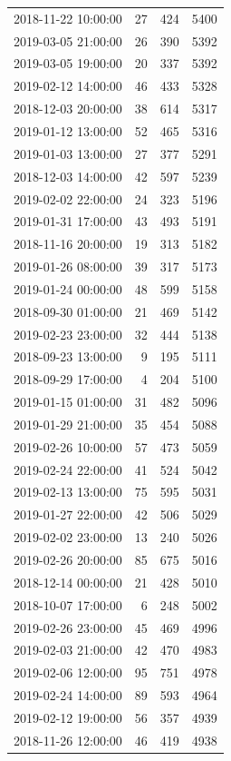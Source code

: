 \begin{tabular}{lrrr}
2018-11-22 10:00:00 & 27 & 424 & 5400 \\
2019-03-05 21:00:00 & 26 & 390 & 5392 \\
2019-03-05 19:00:00 & 20 & 337 & 5392 \\
2019-02-12 14:00:00 & 46 & 433 & 5328 \\
2018-12-03 20:00:00 & 38 & 614 & 5317 \\
2019-01-12 13:00:00 & 52 & 465 & 5316 \\
2019-01-03 13:00:00 & 27 & 377 & 5291 \\
2018-12-03 14:00:00 & 42 & 597 & 5239 \\
2019-02-02 22:00:00 & 24 & 323 & 5196 \\
2019-01-31 17:00:00 & 43 & 493 & 5191 \\
2018-11-16 20:00:00 & 19 & 313 & 5182 \\
2019-01-26 08:00:00 & 39 & 317 & 5173 \\
2019-01-24 00:00:00 & 48 & 599 & 5158 \\
2018-09-30 01:00:00 & 21 & 469 & 5142 \\
2019-02-23 23:00:00 & 32 & 444 & 5138 \\
2018-09-23 13:00:00 & 9 & 195 & 5111 \\
2018-09-29 17:00:00 & 4 & 204 & 5100 \\
2019-01-15 01:00:00 & 31 & 482 & 5096 \\
2019-01-29 21:00:00 & 35 & 454 & 5088 \\
2019-02-26 10:00:00 & 57 & 473 & 5059 \\
2019-02-24 22:00:00 & 41 & 524 & 5042 \\
2019-02-13 13:00:00 & 75 & 595 & 5031 \\
2019-01-27 22:00:00 & 42 & 506 & 5029 \\
2019-02-02 23:00:00 & 13 & 240 & 5026 \\
2019-02-26 20:00:00 & 85 & 675 & 5016 \\
2018-12-14 00:00:00 & 21 & 428 & 5010 \\
2018-10-07 17:00:00 & 6 & 248 & 5002 \\
2019-02-26 23:00:00 & 45 & 469 & 4996 \\
2019-02-03 21:00:00 & 42 & 470 & 4983 \\
2019-02-06 12:00:00 & 95 & 751 & 4978 \\
2019-02-24 14:00:00 & 89 & 593 & 4964 \\
2019-02-12 19:00:00 & 56 & 357 & 4939 \\
2018-11-26 12:00:00 & 46 & 419 & 4938 \\

\end{tabular}
